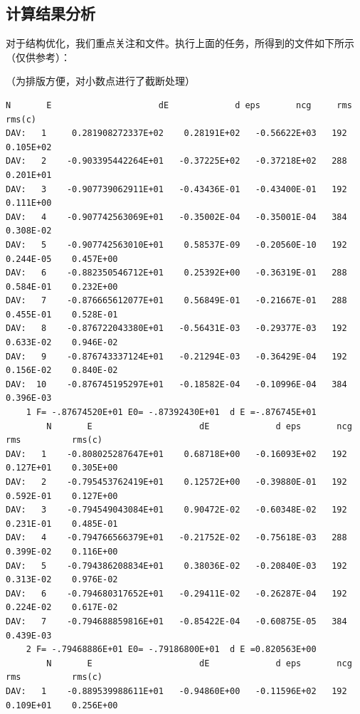 \subsection{计算结果分析}\label{subsec:对坐标进行优化ISIF=2-计算结果分析}

对于结构优化，我们重点关注和文件。执行上面的任务，所得到的文件如下所示（仅供参考）：

（为排版方便，对小数点进行了截断处理）

\begin{lstlisting}[caption=OSZICAR,basicstyle=\tiny]
        N       E                     dE             d eps       ncg     rms          rms(c)
DAV:   1     0.281908272337E+02    0.28191E+02   -0.56622E+03   192   0.105E+02
DAV:   2    -0.903395442264E+01   -0.37225E+02   -0.37218E+02   288   0.201E+01
DAV:   3    -0.907739062911E+01   -0.43436E-01   -0.43400E-01   192   0.111E+00
DAV:   4    -0.907742563069E+01   -0.35002E-04   -0.35001E-04   384   0.308E-02
DAV:   5    -0.907742563010E+01    0.58537E-09   -0.20560E-10   192   0.244E-05    0.457E+00
DAV:   6    -0.882350546712E+01    0.25392E+00   -0.36319E-01   288   0.584E-01    0.232E+00
DAV:   7    -0.876665612077E+01    0.56849E-01   -0.21667E-01   288   0.455E-01    0.528E-01
DAV:   8    -0.876722043380E+01   -0.56431E-03   -0.29377E-03   192   0.633E-02    0.946E-02
DAV:   9    -0.876743337124E+01   -0.21294E-03   -0.36429E-04   192   0.156E-02    0.840E-02
DAV:  10    -0.876745195297E+01   -0.18582E-04   -0.10996E-04   384   0.396E-03
    1 F= -.87674520E+01 E0= -.87392430E+01  d E =-.876745E+01
        N       E                     dE             d eps       ncg     rms          rms(c)
DAV:   1    -0.808025287647E+01    0.68718E+00   -0.16093E+02   192   0.127E+01    0.305E+00
DAV:   2    -0.795453762419E+01    0.12572E+00   -0.39880E-01   192   0.592E-01    0.127E+00
DAV:   3    -0.794549043084E+01    0.90472E-02   -0.60348E-02   192   0.231E-01    0.485E-01
DAV:   4    -0.794766566379E+01   -0.21752E-02   -0.75618E-03   288   0.399E-02    0.116E+00
DAV:   5    -0.794386208834E+01    0.38036E-02   -0.20840E-03   192   0.313E-02    0.976E-02
DAV:   6    -0.794680317652E+01   -0.29411E-02   -0.26287E-04   192   0.224E-02    0.617E-02
DAV:   7    -0.794688859816E+01   -0.85422E-04   -0.60875E-05   384   0.439E-03
    2 F= -.79468886E+01 E0= -.79186800E+01  d E =0.820563E+00
        N       E                     dE             d eps       ncg     rms          rms(c)
DAV:   1    -0.889539988611E+01   -0.94860E+00   -0.11596E+02   192   0.109E+01    0.256E+00

\end{lstlisting}
